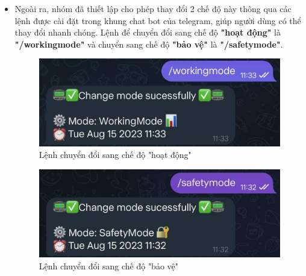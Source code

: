 \documentclass{report}
\begin{document}
\begin{itemize}
    \item Ngoài ra, nhóm đã thiết lập cho phép thay đổi 2 chế độ này thông qua các lệnh được cài đặt trong khung chat bot của telegram, giúp người dùng có thể thay đổi nhanh chóng. Lệnh để  chuyển đổi sang chế độ \textbf{"hoạt động"} là \textbf{"/workingmode"} và chuyển sang chế độ \textbf{"bảo vệ"} là \textbf{"/safetymode"}.
    \begin{figure}[H]
        \includegraphics[width=\textwidth, keepaspectratio]{img/change_work.jpg}
        \centering
        \caption{Lệnh chuyển đổi sang chế độ "hoạt động"}
    \end{figure}

    \begin{figure}[H]
        \includegraphics[width=\textwidth, keepaspectratio]{img/change_safe.jpg}
        \centering
        \caption{Lệnh chuyển đổi sang chế độ "bảo vệ"}
    \end{figure}
    
    
\end{itemize}


\newpage
\end{document}
